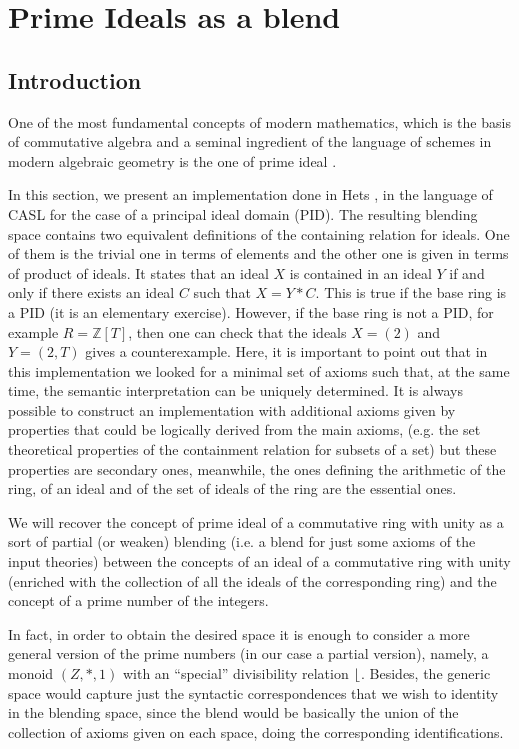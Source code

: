 \section{Prime Ideals as a blend}
\label{sec:prime_ideals}

\subsection*{Introduction}
One of the most fundamental concepts of modern mathematics, which is
the basis of commutative algebra and a seminal ingredient of the
language of schemes in modern algebraic geometry is the one of prime
ideal \parencite{EGAI,Eisenbud95}.

In this section, we present an implementation done in Hets
\parencite{Mossakowskihets}, in the language of CASL for the case of a
principal ideal domain (PID).  The resulting blending space contains
two equivalent definitions of the containing relation for ideals. One
of them is the trivial one in terms of elements and the other one is
given in terms of product of ideals.  It states that an ideal $X$ is
contained in an ideal $Y$ if and only if there exists an ideal $C$
such that $X=Y*C$. This is true if the base ring is a PID (it is an
elementary exercise). However, if the base ring is not a PID, for
example $R=\mathbb{Z}[T]$, then one can check that the ideals $X=(2)$
and $Y=(2,T)$ gives a counterexample.  Here, it is important to point
out that in this implementation we looked for a minimal set of axioms
such that, at the same time, the semantic interpretation can be
uniquely determined. It is always possible to construct an
implementation with additional axioms given by properties that could
be logically derived from the main axioms, (e.g. the set theoretical
properties of the containment relation for subsets of a set) but these
properties are secondary ones, meanwhile, the ones defining the
arithmetic of the ring, of an ideal and of the set of ideals of the
ring are the essential ones.

We will recover the concept of prime ideal of a
commutative ring with unity as a sort of partial (or weaken) blending
(i.e. a blend for just some axioms of the input theories) between the
concepts of an ideal of a commutative ring with unity (enriched with
the collection of all the ideals of the corresponding ring) and the
concept of a prime number of the integers.

In fact, in order to obtain the desired space it is enough to consider
a more general version of the prime numbers (in our case a partial
version), namely, a monoid $(Z,*,1)$ with an ``special'' divisibility
relation $\lfloor$. Besides, the generic space would capture just
the syntactic correspondences that we wish to identity in the
blending space, since the blend would be basically the union of the
collection of axioms given on each space, doing the corresponding
identifications.

